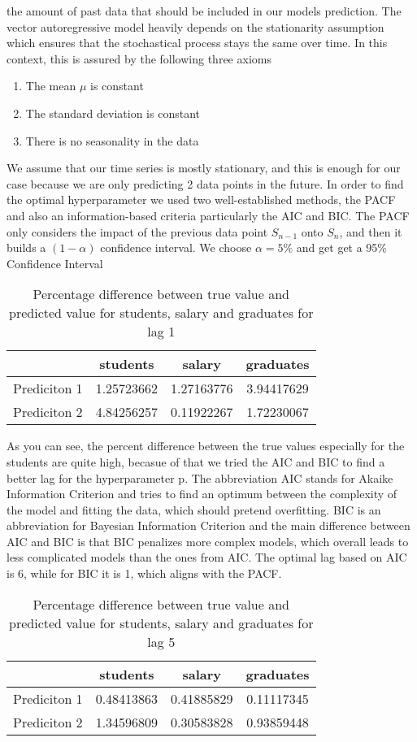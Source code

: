 \documentclass{article}
\theoremstyle{plain}
\theoremstyle{definition}
\theoremstyle{remark}
\begin{document}
the amount of past data that should be included in our models prediction. 
The vector autoregressive model heavily depends on the stationarity assumption which ensures that the stochastical process stays the same over time. 
In this context, this is assured by the following three axioms
\begin{enumerate}[label=\Roman*]
    \item The mean $\mu$ is constant
    \item The standard deviation is constant
    \item There is no seasonality in the data
\end{enumerate}
We assume that our time series is mostly stationary, and this is enough for our case because we are only predicting 2 data points in the future.
In order to find the optimal hyperparameter we used two well-established methods, the PACF and also an information-based criteria particularly the AIC and 
BIC. The PACF only considers the impact of the previous data point $S_{n-1}$ onto $S_{n}$, and then it builds a $(1-\alpha)$ confidence interval. We choose $\alpha = 5\%$ and get
get a 95\% Confidence Interval 
\begin{table}[H]
    \centering
    \begin{tabular}{c|c|c|c}
        & students & salary & graduates \\
        \hline
        Prediciton 1 & 1.25723662 & 1.27163776 & 3.94417629 \\
        \hline
        Prediciton 2 & 4.84256257 & 0.11922267 & 1.72230067
    \end{tabular}
    \caption{Percentage difference between true value and predicted value for students, salary and graduates for lag 1}
\end{table}
As you can see, the percent difference between the true values especially for the students are quite high, becasue of that we tried the AIC and BIC to find a better lag for the 
hyperparameter p.  The abbreviation AIC stands for Akaike Information Criterion and tries to find an optimum between the complexity of the model and fitting the data, which should pretend overfitting. 
BIC is an abbreviation for Bayesian Information Criterion and the main difference between AIC and BIC is that BIC penalizes more complex models, which overall leads to less complicated models than the ones from AIC.
The optimal lag based on AIC is 6, while for BIC it is 1, which aligns with the PACF.
\begin{table}[H]
    \centering
    \begin{tabular}{c|c|c|c}
        & students & salary & graduates \\
        \hline
        Prediciton 1 & 0.48413863 & 0.41885829 & 0.11117345 \\
        \hline
        Prediciton 2 & 1.34596809 & 0.30583828 & 0.93859448
    \end{tabular}
    \caption{Percentage difference between true value and predicted value for students, salary and graduates for lag 5}
\end{table}
\end{document}
